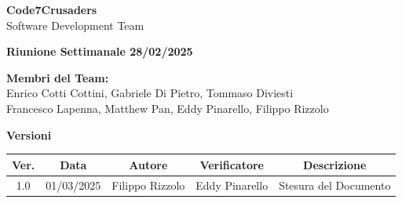\documentclass{article}
\begin{document}
\begin{titlepage}
    {\Huge \textbf{Code7Crusaders}}\\
    \vspace{0.5cm}
    {\Large Software Development Team}\\
    \vspace{2cm}
        
        {\large \textbf{Riunione Settimanale 28/02/2025}}\\
    \vspace{5cm}                           %
    
    
    \textbf{Membri del Team:}\\
    Enrico Cotti Cottini, Gabriele Di Pietro, Tommaso Diviesti \\
    Francesco Lapenna, Matthew Pan, Eddy Pinarello, Filippo Rizzolo \\
    \vspace{0.5cm}
    
    \vspace{1cm}
\end{titlepage}



\newpage
\begin{table}[h!]
\centering
\textbf{Versioni} \\ %
\vspace{2mm} %
\begin{tabular}{|c|c|c|c|c|}
    \hline
    \textbf{Ver.} & \textbf{Data} & \textbf{Autore} & \textbf{Verificatore} & \textbf{Descrizione} \\
    \hline
    1.0 & 01/03/2025 & Filippo Rizzolo & Eddy Pinarello & Stesura del Documento \\ 
    \hline                                  %
\end{tabular}
\end{table}
\vspace{3cm}
\tableofcontents



\newpage
\end{document}
